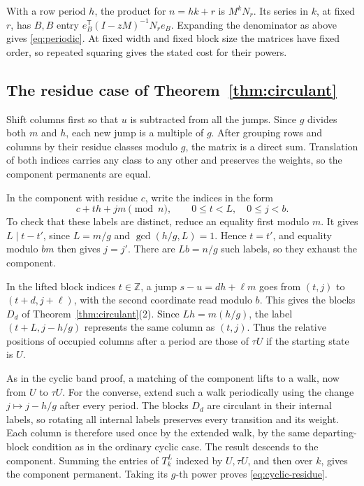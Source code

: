 \documentclass[11pt,reqno]{amsart}
\theoremstyle{remark}
\numberwithin{equation}{section}
\begin{document}
With a row period \(h\), the product for \(n=hk+r\) is \(M^kN_r\). Its
series in \(k\), at fixed \(r\), has \(B,B\) entry \(e_B^{\mathsf
T}(I-zM)^{-1}N_r e_B\). Expanding the denominator as above gives
\eqref{eq:periodic}. At fixed width and fixed block size the matrices
have fixed order, so repeated squaring gives the stated cost for their
powers.

\subsection{The residue case of Theorem~\ref{thm:circulant}}

Shift columns first so that \(u\) is subtracted from all the jumps. Since
\(g\) divides both \(m\) and \(h\), each new jump is a multiple of \(g\).
After grouping rows and columns by their residue classes modulo \(g\),
the matrix is a direct sum. Translation of both indices carries any class
to any other and preserves the weights, so the component permanents are
equal.

In the component with residue \(c\), write the indices in the form
\[
 c+th+jm\pmod n,\qquad 0\le t<L,\quad 0\le j<b.
\]
To check that these labels are distinct, reduce an equality first modulo
\(m\). It gives \(L\mid t-t'\), since \(L=m/g\) and \(\gcd(h/g,L)=1\).
Hence \(t=t'\), and equality modulo \(bm\) then gives \(j=j'\). There are
\(Lb=n/g\) such labels, so they exhaust the component.

In the lifted block indices \(t\in\mathbb Z\), a jump \(s-u=dh+\ell m\)
goes from \((t,j)\) to \((t+d,j+\ell)\), with the second coordinate read
modulo \(b\). This gives the blocks \(D_d\) of
Theorem~\ref{thm:circulant}(2). Since \(Lh=m(h/g)\), the label
\((t+L,j-h/g)\) represents the same column as \((t,j)\). Thus the
relative positions of occupied columns after a period are those of \(\tau
U\) if the starting state is \(U\).

As in the cyclic band proof, a matching of the component lifts to a walk,
now from \(U\) to \(\tau U\). For the converse, extend such a walk
periodically using the change \(j\mapsto j-h/g\) after every period. The
blocks \(D_d\) are circulant in their internal labels, so rotating all
internal labels preserves every transition and its weight. Each column is
therefore used once by the extended walk, by the same departing-block
condition as in the ordinary cyclic case. The result descends to the
component. Summing the entries of \(T_k^L\) indexed by \(U,\tau U\), and
then over \(k\), gives the component permanent. Taking its \(g\)-th power
proves \eqref{eq:cyclic-residue}.
\end{document}
